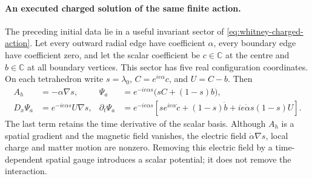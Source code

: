 \paragraph{An executed charged solution of the same finite action.}
The preceding initial data lie in a useful invariant sector of
\eqref{eq:whitney-charged-action}. Let every outward radial edge have
coefficient \(\alpha\), every boundary edge have coefficient zero, and
let the scalar coefficient be \(c\in\mathbb C\) at the centre and
\(b\in\mathbb C\) at all boundary vertices. This sector has five real
configuration coordinates. On each tetrahedron write \(s=\lambda_0\),
\(C=e^{ie\alpha}c\), and \(U=C-b\). Then
\begin{align}
 A_h&=-\alpha\nabla s,&
 \Psi_a&=e^{-ie\alpha s}\bigl(sC+(1-s)b\bigr),\nonumber\\
 D_x\Psi_a&=e^{-ie\alpha s}U\nabla s,&
 \partial_t\Psi_a&=e^{-ie\alpha s}\left[
 s e^{ie\alpha}\dot c+(1-s)\dot b
       +ie\dot\alpha s(1-s)U\right].
 \label{eq:whitney-charged-symmetric-fields}
\end{align}
The last term retains the time derivative of the scalar basis.
Although \(A_h\) is a spatial gradient and the magnetic field vanishes,
the electric field \(\dot\alpha\nabla s\), local charge and matter
motion are nonzero. Removing this electric field by a time-dependent
spatial gauge introduces a scalar potential; it does not remove the
interaction.

